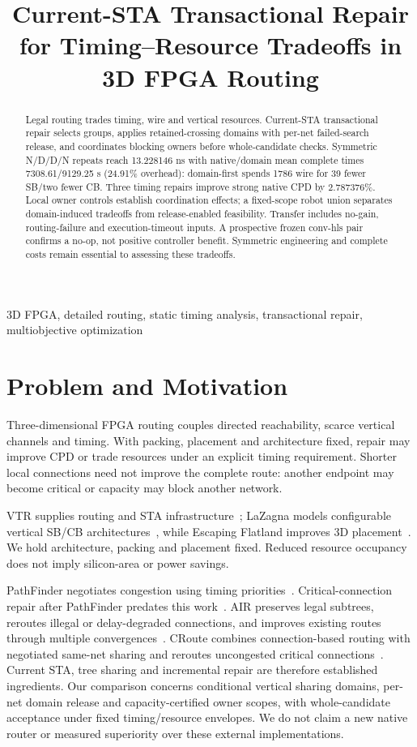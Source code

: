 \documentclass[conference,10pt]{IEEEtran}
\title{Current-STA Transactional Repair for Timing--Resource Tradeoffs in 3D FPGA Routing}
\author{\IEEEauthorblockN{Anonymous development manuscript}}
\begin{document}
\maketitle
\begin{abstract}
Legal routing trades timing, wire and vertical resources. Current-STA transactional repair selects groups, applies retained-crossing domains with per-net failed-search release, and coordinates blocking owners before whole-candidate checks. Symmetric N/D/D/N repeats reach 13.228146 ns with native/domain mean complete times 7308.61/9129.25 s (24.91\% overhead): domain-first spends 1786 wire for 39 fewer SB/two fewer CB. Three timing repairs improve strong native CPD by 2.787376\%. Local owner controls establish coordination effects; a fixed-scope robot union separates domain-induced tradeoffs from release-enabled feasibility. Transfer includes no-gain, routing-failure and execution-timeout inputs. A prospective frozen conv-hls pair confirms a no-op, not positive controller benefit. Symmetric engineering and complete costs remain essential to assessing these tradeoffs.
\end{abstract}
\begin{IEEEkeywords}
3D FPGA, detailed routing, static timing analysis, transactional repair, multiobjective optimization
\end{IEEEkeywords}

\section{Problem and Motivation}
Three-dimensional FPGA routing couples directed reachability, scarce vertical channels and timing. With packing, placement and architecture fixed, repair may improve CPD or trade resources under an explicit timing requirement. Shorter local connections need not improve the complete route: another endpoint may become critical or capacity may block another network.

VTR supplies routing and STA infrastructure~\cite{vtr9paper}; LaZagna models configurable vertical SB/CB architectures~\cite{lazagna}, while Escaping Flatland improves 3D placement~\cite{flatland}. We hold architecture, packing and placement fixed. Reduced resource occupancy does not imply silicon-area or power savings.

PathFinder negotiates congestion using timing priorities~\cite{pathfinder}. Critical-connection repair after PathFinder predates this work~\cite{liurepair}. AIR preserves legal subtrees, reroutes illegal or delay-degraded connections, and improves existing routes through multiple convergences~\cite{air}. CRoute combines connection-based routing with negotiated same-net sharing and reroutes uncongested critical connections~\cite{croute}. Current STA, tree sharing and incremental repair are therefore established ingredients. Our comparison concerns conditional vertical sharing domains, per-net domain release and capacity-certified owner scopes, with whole-candidate acceptance under fixed timing/resource envelopes. We do not claim a new native router or measured superiority over these external implementations.
\end{document}
